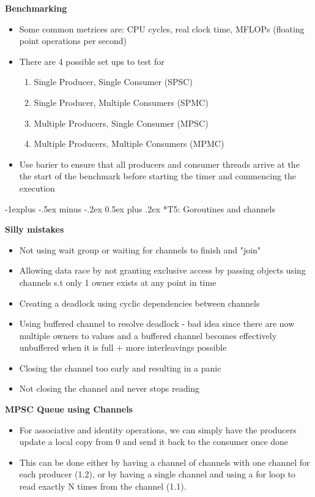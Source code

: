 \documentclass[10pt, landscape]{article}
\makeatletter
\renewcommand{\subsection}{\@startsection{subsection}{2}{0mm}%
                                {-1explus -.5ex minus -.2ex}%
                                {0.5ex plus .2ex}%
                                {\normalfont\normalsize\bfseries}}
\makeatother
\begin{document}
\begin{multicols}{4}
\textbf{Benchmarking} \\
\begin{itemize}
    \item Some common metrices are: CPU cycles, real clock time, MFLOPs (floating point operations per second) 
    \item There are 4 possible set ups to test for 
    \begin{enumerate}
        \item Single Producer, Single Consumer (SPSC)
        \item Single Producer, Multiple Consumers (SPMC)
        \item Multiple Producers, Single Consumer (MPSC)
        \item Multiple Producers, Multiple Consumers (MPMC)
    \end{enumerate}
    \item Use barier to ensure that all producers and consumer threads arrive at the the start of the benchmark before starting the timer and commencing the execution
\end{itemize}

\subsection*{T5: Goroutines and channels}

\textbf{Silly mistakes} \\
\begin{itemize}
    \item Not using wait group or waiting for channels to finish and "join"
    \item Allowing data race by not granting exclusive access by passing objects using channels s.t only 1 owner exists at any point in time    
    \item Creating a deadlock using cyclic dependencies between channels
    \item Using buffered channel to resolve deadlock - bad idea since there are now multiple owners to values and a buffered channel becomes effectively unbuffered when it is full + more interleavings possible
    \item Closing the channel too early and resulting in a panic
    \item Not closing the channel and never stops reading 
\end{itemize}

\textbf{MPSC Queue using Channels} \\
\begin{itemize}
    \item For associative and identity operations, we can simply have the producers update a local copy from 0 and send it back to the consumer once done 
    \item This can be done either by having a channel of channels with one channel for each producer (1.2), or by having a single channel and using a for loop to read exactly N times from the channel (1.1).
\end{itemize}


\end{multicols}
\end{document}
